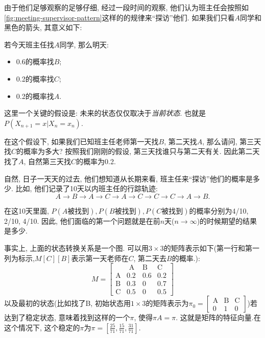     由于他们足够观察的足够仔细, 经过一段时间的观察, 他们认为班主任会按照如\cref{fig:meeting-supervisor-pattern}这样的的规律来``探访''他们.  如果我们只看$A$同学和黑色的箭头, 其意义如下: 

    若今天班主任找$A$同学, 那么明天: 
    \begin{itemize}
        \item 0.6的概率找$B$;
        \item 0.2的概率找$C$;
        \item 0.2的概率找$A$.
    \end{itemize}

    这里一个关键的假设是: 未来的状态仅仅取决于\emph{当前状态}. 也就是$P(X_{n+1}=x|X_n=x_n)$.
    
    在这个假设下, 如果我们已知班主任老师第一天找$B$, 第二天找$A$, 那么请问, 第三天找$C$的概率为多大? 按照我们刚刚的假设, 第三天找谁只与第二天有关. 因此第二天找了$A$, 自然第三天找$C$的概率为0.2. 

    自然, 日子一天天的过去, 他们想知道从长期来看, 班主任来``探访''他们的概率是多少. 比如, 他们记录了10天以内班主任的行踪轨迹: 
    $$
    A \to B \to A\to C \to A \to C\to C\to C\to A\to B.
    $$

    在这10天里面, $P(A\text{被找到}), P(B\text{被找到}),P(C\text{被找到})$的概率分别为4/10, 2/10, 4/10. 因此, 他们面临的第一个问题就是在前$n$天($n\to \infty$)的时候期望的结果是多少. 

    事实上, 上面的状态转换关系是一个图. 可以用$3\times 3$的矩阵表示如下(第一行和第一列为标示,$M[C][B]$表示第一天老师在$C$, 第二天去$B$的概率.):   
    $$
M=\left[\begin{array}{cccc}
&\text { A } & \text {B} & \text {C} \\
\text{A}&0.2 & 0.6 & 0.2 \\
\text{B}&0.3 & 0 & 0.7 \\
\text{C}& 0.5 & 0 & 0.5
\end{array}\right]
$$以及最初的状态(比如找了B, 初始状态用$1\times 3$的矩阵表示为$
\pi_0=\left[\begin{array}{ccc}
\text{A} & \text{B} & \text {C} \\
0 & 1 & 0
\end{array}\right]
$)若达到了稳定状态, 意味着找到这样的一个$\pi$, 使得$\pi A=\pi$. 这就是矩阵的特征向量.在这个情况下, 这个稳定的$\pi$为$\pi=\left[\frac{25}{71}, \frac{15}{71}, \frac{31}{71}\right]$.

